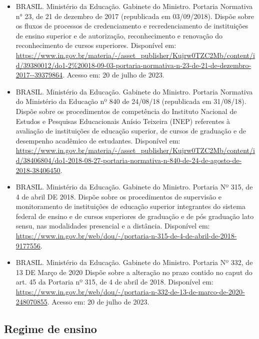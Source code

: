 \begin{itemize}
    \item BRASIL. Ministério da Educação. Gabinete do Ministro. Portaria
    Normativa n° 23, de 21 de dezembro de 2017 (republicada em
    03/09/2018). Dispõe sobre os fluxos de processos de credenciamento
    e recredenciamento de instituições de ensino superior e de
    autorização, reconhecimento e renovação do reconhecimento de
    cursos superiores. Disponível em:
    \url{https://www.in.gov.br/materia/-/asset_publisher/Kujrw0TZC2Mb/content/id/39380012/do1-2%20018-09-03-portaria-normativa-n-23-de-21-de-dezembro-2017--39379864}.
    Acesso em: 20 de julho de 2023.

  \item BRASIL. Ministério da Educação. Gabinete do Ministro. Portaria
    Normativa do Ministério da Educação nº 840 de 24/08/18
    (republicada em 31/08/18). Dispõe sobre os procedimentos de
    competência do Instituto Nacional de Estudos e Pesquisas
    Educacionais Anísio Teixeira (INEP) referentes à avaliação de
    instituições de educação superior, de cursos de graduação e de
    desempenho acadêmico de estudantes. Disponível em:
    \url{https://www.in.gov.br/materia/-/asset_publisher/Kujrw0TZC2Mb/content/id/38406804/do1-2018-08-27-portaria-normativa-n-840-de-24-de-agosto-de-2018-38406450}.
    
  \item BRASIL. Ministério da Educação. Gabinete do Ministro.
    Portaria Nº 315, de 4 de abril DE 2018. Dispõe sobre os
    procedimentos de supervisão e monitoramento de instituições de
    educação superior integrantes do sistema federal de ensino e de
    cursos superiores de graduação e de pós graduação lato sensu, nas
    modalidades presencial e a distância. Disponível em:
    \url{https://www.in.gov.br/web/dou/-/portaria-n-315-de-4-de-abril-de-2018-9177556}.
    
  \item BRASIL. Ministério da Educação. Gabinete do Ministro. Portaria
    Nº 332, de 13 DE Março de 2020 Dispõe sobre a alteração no prazo
    contido no caput do art. 45 da Portaria nº 315, de 4 de abril de
    2018. Disponível em:
    \url{https://www.in.gov.br/web/dou/-/portaria-n-332-de-13-de-marco-de-2020-248070855}.
    Acesso em: 20 de julho de 2023.
\end{itemize}


\subsection{Regime de ensino}

